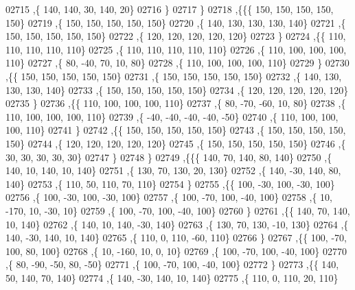 \begin{DoxyCode}
02715     ,\{   140,   140,    30,   140,    20\}
02716     \}
02717    \}
02718   ,\{\{\{   150,   150,   150,   150,   150\}
02719     ,\{   150,   150,   150,   150,   150\}
02720     ,\{   140,   130,   130,   130,   140\}
02721     ,\{   150,   150,   150,   150,   150\}
02722     ,\{   120,   120,   120,   120,   120\}
02723     \}
02724    ,\{\{   110,   110,   110,   110,   110\}
02725     ,\{   110,   110,   110,   110,   110\}
02726     ,\{   110,   100,   100,   100,   110\}
02727     ,\{    80,   -40,    70,    10,    80\}
02728     ,\{   110,   100,   100,   100,   110\}
02729     \}
02730    ,\{\{   150,   150,   150,   150,   150\}
02731     ,\{   150,   150,   150,   150,   150\}
02732     ,\{   140,   130,   130,   130,   140\}
02733     ,\{   150,   150,   150,   150,   150\}
02734     ,\{   120,   120,   120,   120,   120\}
02735     \}
02736    ,\{\{   110,   100,   100,   100,   110\}
02737     ,\{    80,   -70,   -60,    10,    80\}
02738     ,\{   110,   100,   100,   100,   110\}
02739     ,\{   -40,   -40,   -40,   -40,   -50\}
02740     ,\{   110,   100,   100,   100,   110\}
02741     \}
02742    ,\{\{   150,   150,   150,   150,   150\}
02743     ,\{   150,   150,   150,   150,   150\}
02744     ,\{   120,   120,   120,   120,   120\}
02745     ,\{   150,   150,   150,   150,   150\}
02746     ,\{    30,    30,    30,    30,    30\}
02747     \}
02748    \}
02749   ,\{\{\{   140,    70,   140,    80,   140\}
02750     ,\{   140,    10,   140,    10,   140\}
02751     ,\{   130,    70,   130,    20,   130\}
02752     ,\{   140,   -30,   140,    80,   140\}
02753     ,\{   110,    50,   110,    70,   110\}
02754     \}
02755    ,\{\{   100,   -30,   100,   -30,   100\}
02756     ,\{   100,   -30,   100,   -30,   100\}
02757     ,\{   100,   -70,   100,   -40,   100\}
02758     ,\{    10,  -170,    10,   -30,    10\}
02759     ,\{   100,   -70,   100,   -40,   100\}
02760     \}
02761    ,\{\{   140,    70,   140,    10,   140\}
02762     ,\{   140,    10,   140,   -30,   140\}
02763     ,\{   130,    70,   130,   -10,   130\}
02764     ,\{   140,   -30,   140,    10,   140\}
02765     ,\{   110,     0,   110,   -60,   110\}
02766     \}
02767    ,\{\{   100,   -70,   100,    80,   100\}
02768     ,\{    10,  -160,    10,     0,    10\}
02769     ,\{   100,   -70,   100,   -40,   100\}
02770     ,\{    80,   -90,   -50,    80,   -50\}
02771     ,\{   100,   -70,   100,   -40,   100\}
02772     \}
02773    ,\{\{   140,    50,   140,    70,   140\}
02774     ,\{   140,   -30,   140,    10,   140\}
02775     ,\{   110,     0,   110,    20,   110\}

\end{DoxyCode}
